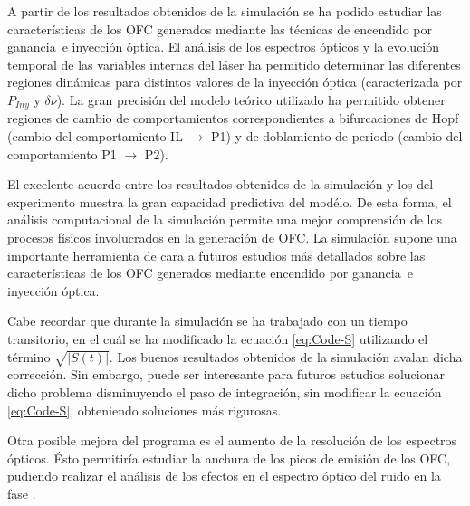\documentclass[a4paper, 11pt, oneside]{book}
\newcommand{\gs}{encendido por ganancia}
\begin{document}
				A partir de los resultados obtenidos de la simulaci\'on se ha podido estudiar las caracter\'isticas de los OFC generados mediante las t\'ecnicas de \gs\ e inyecci\'on \'optica. El an\'alisis de los espectros \'opticos y la evoluci\'on temporal de las variables internas del l\'aser ha permitido determinar las diferentes regiones din\'amicas para distintos valores de la inyecci\'on \'optica (caracterizada por $P_{Iny}$ y $\delta\nu$). La gran precisi\'on del modelo te\'orico utilizado ha permitido obtener regiones de cambio de comportamientos correspondientes a bifurcaciones de Hopf (cambio del comportamiento IL $\rightarrow$ P1) y de doblamiento de periodo (cambio del comportamiento P1 $\rightarrow$ P2).

				El excelente acuerdo entre los resultados obtenidos de la simulaci\'on y los del experimento \cite{Chaves19} muestra la gran capacidad predictiva del mod\'elo. De esta forma, el an\'alisis computacional de la simulación permite una mejor comprensi\'on de los procesos f\'isicos involucrados en la generaci\'on de OFC. La simulaci\'on supone una importante herramienta de cara a futuros estudios m\'as detallados sobre las caracter\'isticas de los OFC generados mediante \gs\ e inyecci\'on \'optica.

				Cabe recordar que durante la simulación se ha trabajado con un tiempo transitorio, en el cu\'al se ha modificado la ecuaci\'on \ref{eq:Code-S} utilizando el t\'ermino $\sqrt{|S(t)|}$. Los buenos resultados obtenidos de la simulación avalan dicha correcci\'on. Sin embargo, puede ser interesante para futuros estudios solucionar dicho problema disminuyendo el paso de integraci\'on, sin modificar la ecuaci\'on \ref{eq:Code-S}, obteniendo soluciones m\'as rigurosas.

				Otra posible mejora del programa es el aumento de la resoluci\'on de los espectros \'opticos. \'Esto permitir\'ia estudiar la anchura de los picos de emisi\'on de los OFC, pudiendo realizar el an\'alisis de los efectos en el espectro \'optico del ruido en la fase .


			
			

				
\end{document}
